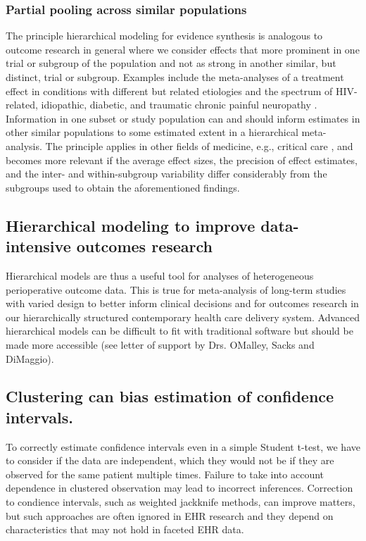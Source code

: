 \documentclass[11pt,notitlepage]{article}
\begin{document}
\subsubsection*{Partial pooling across similar populations}
The principle hierarchical modeling for evidence synthesis is analogous to outcome research in general where we 
consider effects that more prominent in one trial or subgroup of the population and not as strong in another similar, but 
distinct, trial or subgroup. Examples include the meta-analyses of a treatment effect in conditions with different but 
related etiologies and the spectrum of HIV-related, idiopathic, diabetic, and traumatic chronic painful neuropathy 
\cite{Andreae2015}. Information in one subset or study population can and should inform estimates in other similar populations 
to some estimated extent in a hierarchical meta-analysis. The principle applies in other fields of medicine, e.g., critical care
\cite{Roth2015CriticalCare}, and becomes more relevant if the average effect sizes, the precision of effect 
estimates, and the inter- and within-subgroup variability differ considerably from the subgroups used to obtain 
the aforementioned findings.

\subsection*{Hierarchical modeling to improve data-intensive outcomes research}
 
Hierarchical models are thus a useful tool for analyses of
heterogeneous perioperative outcome data. This is true for meta-analysis 
of long-term studies with varied design to better inform clinical 
decisions\cite{AndreaeJohnsonAbstract2013,Spiegelhalter2004bayesian} and 
for outcomes research in our hierarchically structured contemporary health care delivery system. 
Advanced hierarchical models can be difficult to fit with traditional software but should be 
made more accessible (see letter of support by Drs. OMalley, Sacks and DiMaggio).

\subsection*{Clustering can bias estimation of confidence intervals.} To 
correctly estimate confidence intervals even in a simple Student t-test, 
we have to consider if the data are independent, which they would not be if
they are observed for the same patient multiple times. Failure to take into 
account dependence in clustered observation may lead to incorrect inferences. 
Correction to condience intervals, such as weighted jackknife methods, can 
improve matters, but such approaches are often ignored in EHR research 
and they depend on characteristics that may not hold in faceted EHR data. 
\end{document}
